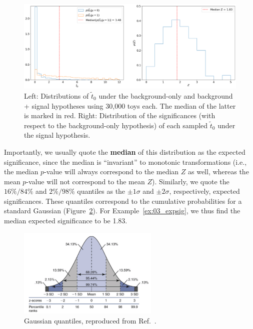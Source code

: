 \begin{figure}[htb]
\centering
\includegraphics[width=\textwidth]{figures/03-Stats/04-expected/1.png}
\caption[Left: Distributions of $\tilde{t}_0$ under the background-only and background + signal hypotheses using 30,000 toys each.]{Left: Distributions of $\tilde{t}_0$ under the background-only and background + signal hypotheses using 30,000 toys each. 
The median of the latter is marked in red.
Right: Distribution of the significances (with respect to the background-only hypothesis) of each sampled $\tilde{t}_0$ under the signal hypothesis.
}
\label{fig:03_expZ}
\end{figure}

Importantly, we usually quote the \textbf{median} of this distribution as the expected significance, since the median is ``invariant'' to monotonic transformations (i.e., the median $p$-value will always correspond to the median $Z$ as well, whereas the mean $p$-value will not correspond to the mean $Z$).
Similarly, we quote the $16\%/84\%$ and $2\%/98\%$ quantiles as the $\pm 1\sigma$ and $\pm 2\sigma$, respectively, expected significances.
These quantiles correspond to the cumulative probabilities for a standard Gaussian (Figure~\ref{fig:03_gaussian_quantiles}). 
For Example~\ref{ex:03_expsig}, we thus find the median expected significance to be 1.83.

\begin{figure}[htb]
\centering
\includegraphics[width=0.6\textwidth]{figures/03-Stats/04-expected/gaussian_quantiles.png}
\captionsetup{justification=centering}
\caption{Gaussian quantiles, reproduced from Ref.~\cite{Stiller:thesis}.}
\label{fig:03_gaussian_quantiles}
\end{figure}


